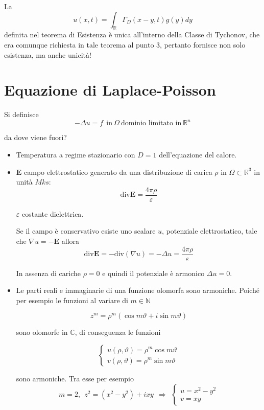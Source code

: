 \documentclass[10pt,a4paper,twoside,openright]{book}
\begin{document}
La
\begin{equation*}
u(x,t) =\int _{\mathbb{R}} \Gamma _{D}(x-y,t) g(y) dy
\end{equation*}
definita nel teorema di Esistenza è unica all'interno della Classe di Tychonov, che era comunque richiesta in tale teorema al punto $3$, pertanto fornisce non solo esistenza, ma anche unicità!
\chapter{Equazione di Laplace-Poisson}
\begin{definition}
 Si definisce
\begin{equation*}
\boxed{-\Delta u=f} \ \ \text{in} \ \Omega \ \text{dominio limitato in} \ \mathbb{R}^{n}
\end{equation*}
\end{definition}
da dove viene fuori?
\begin{itemize}
\item Temperatura a regime stazionario con $D=1$ dell'equazione del calore.
\item $\mathbf{E}$ campo elettrostatico generato da una distribuzione di carica $\rho $ in $\Omega \subset \mathbb{R}^{3}$ in unità $Mks$:\begin{equation*}
\mathrm{div}\mathbf{E} =\frac{4\pi \rho }{\varepsilon }
\end{equation*}

$\varepsilon $ costante dielettrica.

Se il campo è conservativo esiste uno scalare $u$, potenziale elettrostatico, tale che $\nabla u=-\mathbf{E}$ allora\begin{equation*}
\mathrm{div}\mathbf{E} =-\mathrm{div}(\nabla u) =-\Delta u=\frac{4\pi \rho }{\varepsilon }
\end{equation*}

In assenza di cariche $\rho =0$ e quindi il potenziale è armonico $\Delta u=0$.
\item Le parti reali e immaginarie di una funzione olomorfa sono armoniche. Poiché per esempio le funzioni al variare di $m\in \mathbb{N}$

\begin{equation*}
z^{m} =\rho ^{m}(\cos m\vartheta +i\sin m\vartheta)
\end{equation*}

sono olomorfe in $\mathbb{C}$, di conseguenza le funzioni

\begin{equation*}
\begin{cases}
u( \rho,\vartheta) =\rho ^{m}\cos m\vartheta \\
v( \rho,\vartheta) =\rho ^{m}\sin m\vartheta 
\end{cases}
\end{equation*}

sono armoniche. Tra esse per esempio\begin{equation*}
m=2,\ \ z^{2} =\left( x^{2} -y^{2}\right) +ixy\ \ \Rightarrow \ \ \begin{cases}
u=x^{2} -y^{2}\\
v=xy
\end{cases}
\end{equation*}
\end{itemize}
\end{document}
